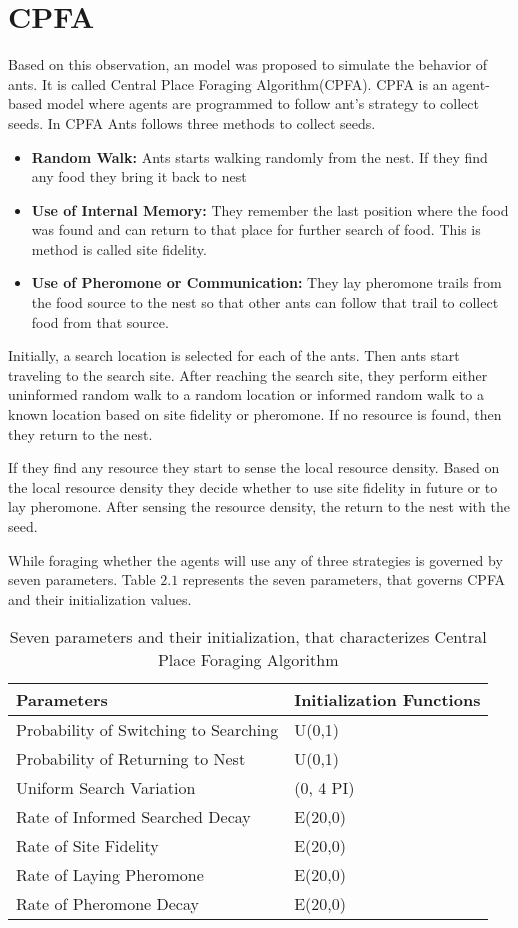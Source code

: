 \section{\label{section:CPFA}CPFA}
 Based on this observation, an model was proposed to simulate the behavior of ants. It is called Central Place Foraging Algorithm(CPFA). CPFA is an agent-based model where agents are programmed to follow ant’s strategy to collect seeds. In CPFA Ants follows three methods to collect seeds.
\begin{itemize}
	\item \textbf{Random Walk:} Ants starts walking randomly from the nest. If they find any food they bring it back to nest
	\item \textbf{Use of Internal Memory:} They remember the last position where the food was found and can return to that place for further search of food. This is method is called site fidelity.
	\item \textbf{Use of Pheromone or Communication:} They lay  pheromone trails from the food source to the nest so that other ants can follow that trail to collect food from that source.	
\end{itemize} 
Initially, a search location is selected for each of the ants. Then ants start traveling to the search site. After reaching the search site, they perform either uninformed random walk to a random location or informed random walk to a known location based on site fidelity or pheromone. If no resource is found, then they return to the nest.\par
If they find any resource they start to sense the local resource density. Based on the local resource density they decide whether to use site fidelity in future or to lay pheromone. After sensing the resource density, the return to the nest with the seed.\par
While foraging whether the agents will use any of three strategies is governed by seven parameters. Table $2.1$ represents the seven parameters, that governs CPFA and their initialization values.\par
\begin{table}[h]
	\begin{tabular}{ |p{}|p{}| } 
		\hline
		\textbf{Parameters} & \textbf{Initialization Functions} \\
		\hline 
		Probability of Switching to Searching & U(0,1)\\ 
		\hline
		Probability of Returning to Nest & U(0,1)\\ 
		\hline
		Uniform Search Variation & (0, 4 PI)\\
		\hline
		Rate of Informed Searched Decay & E(20,0)\\
		\hline
		Rate of Site Fidelity & E(20,0)\\
		\hline
		Rate of Laying Pheromone & E(20,0)\\
		\hline
		Rate of Pheromone Decay & E(20,0)\\
		\hline
	\end{tabular}
	\caption{Seven parameters and their initialization, that characterizes Central Place Foraging Algorithm}
\end{table}

